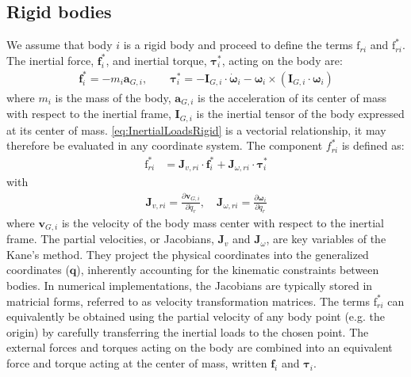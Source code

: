 \documentclass[wes, manuscript]{copernicus}
\renewcommand{\v}[1]{\boldsymbol{#1}}
\newcommand{\m}[1]{\boldsymbol{#1}}
\newcommand{\kanef}{\mathrm{f}}
\begin{document}
\subsection{Rigid bodies}
\label{sec:rigidbodies}
We assume that body $i$ is a rigid body and proceed to define the terms $\kanef_{ri}$ and $\kanef_{ri}^*$.
The inertial force, $\v{f}_i^*$, and inertial torque, $\v{\tau}_i^*$, acting on the body are:
\begin{align}
     \v{f}_i^* = - m_i \v{a}_{G,i},
         \qquad
     \v{\tau}_i^* = -\m{I}_{G,i} \cdot \v{\dot{\omega}}_i - \v{\omega} _i \times( \m{I}_{G,i}\cdot \v{\omega}_i)
      \label{eq:InertialLoadsRigid}
\end{align}
where $m_i$ is the mass of the body, $\v{a}_{G,i}$ is the acceleration of its center of mass with respect to the inertial frame, $\m{I}_{G,i}$ is the inertial tensor of the body expressed at its center of mass. 
\autoref{eq:InertialLoadsRigid} is a vectorial relationship, it may therefore be evaluated in any coordinate system.
The component $f_{ri}^*$ is defined as:
\begin{align}
   \kanef_{ri}^* &= \v{J}_{v,ri} \cdot \v{f}_i^*  + \v{J}_{\omega,ri} \cdot \v{\tau}_i^*
    \label{eq:frstarRigid}
\end{align}
with
\begin{align}
    \v{J}_{v,ri} = \frac{\partial \v{v}_{G,i}}{\partial \dot{q}_r}
    ,\quad
    \v{J}_{\omega,ri} = \frac{\partial \v{\omega}_{i}}{\partial \dot{q}_r}
\end{align}
where $\v{v}_{G,i}$ is the velocity of the body mass center with respect to the inertial frame.
The partial velocities, or Jacobians, $\v{J}_v$ and $\v{J}_\omega$, are key variables of the Kane's method.
They project the physical coordinates into the generalized coordinates ($\v{q}$), inherently accounting for the kinematic constraints between bodies.
In numerical implementations, the Jacobians are typically stored in matricial forms, referred to as velocity transformation matrices.
The terms $\kanef_{ri}^*$ can equivalently be obtained using the partial velocity of any body point (e.g. the origin) by carefully transferring the inertial loads to the chosen point.
The external forces and torques acting on the body are combined into an equivalent force and torque acting at the center of mass, written $\v{f}_i$  and $\v{\tau}_i$. 
\end{document}
